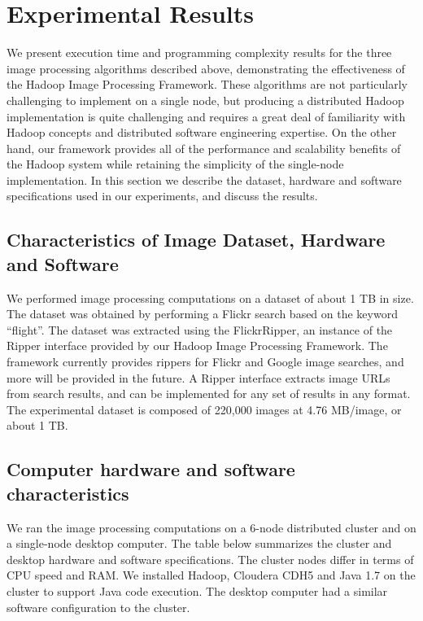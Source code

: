 \documentclass[conference]{IEEEtran}
\begin{document}
\section{Experimental Results}

We present execution time and programming complexity results for the
three image processing algorithms described above, demonstrating the
effectiveness of the Hadoop Image Processing Framework.  These
algorithms are not particularly challenging to implement on a single
node, but producing a distributed Hadoop implementation is quite
challenging and requires a great deal of familiarity with Hadoop
concepts and distributed software engineering expertise.  On the other
hand, our framework provides all of the performance and scalability
benefits of the Hadoop system while retaining the simplicity of the
single-node implementation.  In this section we describe the dataset, 
hardware and software specifications used in our experiments, and
discuss the results.



\subsection{Characteristics of Image Dataset, Hardware and Software}
We performed image processing computations on a dataset of about 1 TB
in size. The dataset was obtained by performing a Flickr search based
on the keyword ``flight''.  The dataset was extracted using the
FlickrRipper, an instance of the Ripper interface provided by our
Hadoop Image Processing Framework.  The framework currently provides
rippers for Flickr and Google image searches, and more will be
provided in the future.  A Ripper interface extracts image URLs from
search results, and can be implemented for any set of results in any
format.  The experimental dataset is composed of 220,000 images at 4.76
MB/image, or about 1 TB.

\subsection{Computer hardware and software characteristics}
We ran the image processing computations on a 6-node distributed
cluster and on a single-node desktop computer. The table below
summarizes the cluster and desktop hardware and software
specifications. The cluster nodes differ in terms of CPU speed and
RAM. We installed Hadoop, Cloudera CDH5 and Java 1.7 on the cluster to
support Java code execution. The desktop computer had a similar
software configuration to the cluster.
\end{document}

